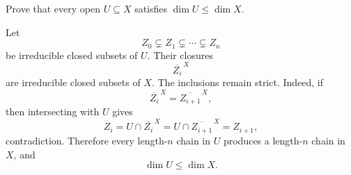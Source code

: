 \begin{problem}\label{prob:vi30-10}
Prove that every open \(U\subseteq X\) satisfies \(\dim U\leq\dim X\).

\end{problem}

\ifdefined\FullProblemDossiers
\begin{solution}
Let
\[
Z_0\subsetneq Z_1\subsetneq\cdots\subsetneq Z_n
\]
be irreducible closed subsets of \(U\). Their closures
\[
\overline{Z_i}^{\,X}
\]
are irreducible closed subsets of \(X\). The inclusions remain strict. Indeed, if
\[
\overline{Z_i}^{\,X}=\overline{Z_{i+1}}^{\,X},
\]
then intersecting with \(U\) gives
\[
Z_i=U\cap\overline{Z_i}^{\,X}
=
U\cap\overline{Z_{i+1}}^{\,X}
=
Z_{i+1},
\]
contradiction. Therefore every length-\(n\) chain in \(U\) produces a length-\(n\) chain in \(X\), and
\[
\boxed{\dim U\le\dim X}.
\]
\end{solution}
\fi
